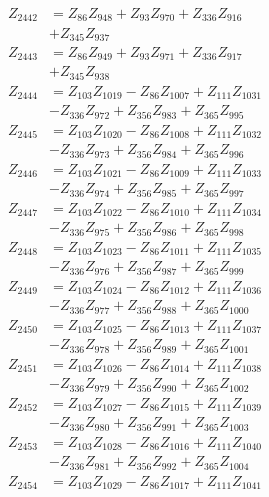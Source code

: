 \begin{multicols}{2}
\begin{align}
Z_{2442} &= Z_{86}Z_{948} + Z_{93}Z_{970} + Z_{336}Z_{916}  \nonumber \\
&+ Z_{345}Z_{937} \nonumber \\
Z_{2443} &= Z_{86}Z_{949} + Z_{93}Z_{971} + Z_{336}Z_{917}  \nonumber \\
&+ Z_{345}Z_{938} \nonumber \\
Z_{2444} &= Z_{103}Z_{1019} - Z_{86}Z_{1007} + Z_{111}Z_{1031}  \nonumber \\
&- Z_{336}Z_{972} + Z_{356}Z_{983} + Z_{365}Z_{995} \nonumber \\
Z_{2445} &= Z_{103}Z_{1020} - Z_{86}Z_{1008} + Z_{111}Z_{1032}  \nonumber \\
&- Z_{336}Z_{973} + Z_{356}Z_{984} + Z_{365}Z_{996} \nonumber \\
Z_{2446} &= Z_{103}Z_{1021} - Z_{86}Z_{1009} + Z_{111}Z_{1033}  \nonumber \\
&- Z_{336}Z_{974} + Z_{356}Z_{985} + Z_{365}Z_{997} \nonumber \\
Z_{2447} &= Z_{103}Z_{1022} - Z_{86}Z_{1010} + Z_{111}Z_{1034}  \nonumber \\
&- Z_{336}Z_{975} + Z_{356}Z_{986} + Z_{365}Z_{998} \nonumber \\
Z_{2448} &= Z_{103}Z_{1023} - Z_{86}Z_{1011} + Z_{111}Z_{1035}  \nonumber \\
&- Z_{336}Z_{976} + Z_{356}Z_{987} + Z_{365}Z_{999} \nonumber \\
Z_{2449} &= Z_{103}Z_{1024} - Z_{86}Z_{1012} + Z_{111}Z_{1036}  \nonumber \\
&- Z_{336}Z_{977} + Z_{356}Z_{988} + Z_{365}Z_{1000} \nonumber \\
Z_{2450} &= Z_{103}Z_{1025} - Z_{86}Z_{1013} + Z_{111}Z_{1037}  \nonumber \\
&- Z_{336}Z_{978} + Z_{356}Z_{989} + Z_{365}Z_{1001} \nonumber \\
Z_{2451} &= Z_{103}Z_{1026} - Z_{86}Z_{1014} + Z_{111}Z_{1038}  \nonumber \\
&- Z_{336}Z_{979} + Z_{356}Z_{990} + Z_{365}Z_{1002} \nonumber \\
Z_{2452} &= Z_{103}Z_{1027} - Z_{86}Z_{1015} + Z_{111}Z_{1039}  \nonumber \\
&- Z_{336}Z_{980} + Z_{356}Z_{991} + Z_{365}Z_{1003} \nonumber \\
Z_{2453} &= Z_{103}Z_{1028} - Z_{86}Z_{1016} + Z_{111}Z_{1040}  \nonumber \\
&- Z_{336}Z_{981} + Z_{356}Z_{992} + Z_{365}Z_{1004} \nonumber \\
Z_{2454} &= Z_{103}Z_{1029} - Z_{86}Z_{1017} + Z_{111}Z_{1041}  \nonumber \\

\end{align}
\end{multicols}
